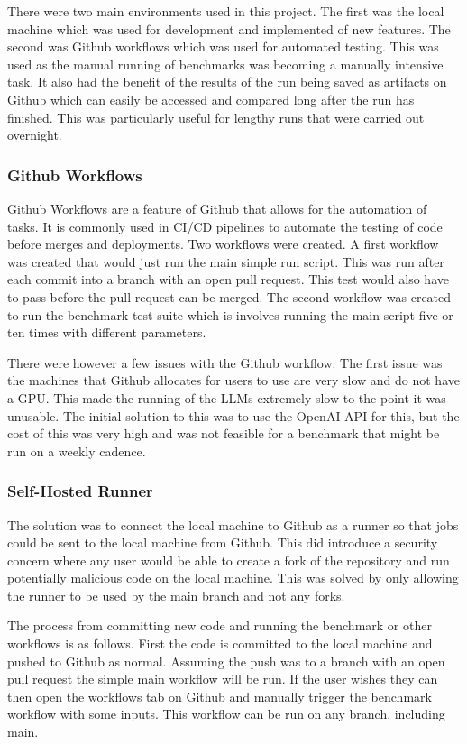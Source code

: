 \documentclass[12pt]{extarticle}
\begin{document}
There were two main environments used in this project. The first was the local machine which was used for development and implemented of new features. The second was Github workflows which was used for automated testing. This was used as the manual running of benchmarks was becoming a manually intensive task. It also had the benefit of the results of the run being saved as artifacts on Github which can easily be accessed and compared long after the run has finished. This was particularly useful for lengthy runs that were carried out overnight.

\subsubsection{Github Workflows}

Github Workflows are a feature of Github that allows for the automation of tasks. It is commonly used in CI/CD pipelines to automate the testing of code before merges and deployments. Two workflows were created. A first workflow was created that would just run the main simple run script. This was run after each commit into a branch with an open pull request. This test would also have to pass before the pull request can be merged. The second workflow was created to run the benchmark test suite which is involves running the main script five or ten times with different parameters.

There were however a few issues with the Github workflow. The first issue was the machines that Github allocates for users to use are very slow and do not have a GPU. This made the running of the LLMs extremely slow to the point it was unusable. The initial solution to this was to use the OpenAI API for this, but the cost of this was very high and was not feasible for a benchmark that might be run on a weekly cadence.

\subsubsection{Self-Hosted Runner}

The solution was to connect the local machine to Github as a runner so that jobs could be sent to the local machine from Github. This did introduce a security concern where any user would be able to create a fork of the repository and run potentially malicious code on the local machine. This was solved by only allowing the runner to be used by the main branch and not any forks.

The process from committing new code and running the benchmark or other workflows is as follows. First the code is committed to the local machine and pushed to Github as normal. Assuming the push was to a branch with an open pull request the simple main workflow will be run. If the user wishes they can then open the workflows tab on Github and manually trigger the benchmark workflow with some inputs. This workflow can be run on any branch, including main.
\end{document}
